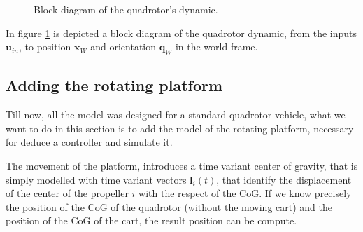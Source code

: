 \begin{figure}[h]
	\caption{Block diagram of the quadrotor's dynamic.}
	\label{fig:quadDynBlock}
\end{figure}

\noindent In figure \ref{fig:quadDynBlock} is depicted a block diagram of the quadrotor dynamic, from the inputs $\mathbf{u}_{in}$, to position $\mathbf{x}_W$ and orientation $\mathbf{q}_W$ in the world frame.

\subsection{Adding the rotating platform}
\label{addPlatform}

Till now, all the model was designed for a standard quadrotor vehicle, what we want to do in this section is to add the model of the rotating platform, necessary for deduce a controller and simulate it.

\noindent The movement of the platform, introduces a time variant center of gravity, that is simply modelled with time variant vectors $\mathbf{l}_i(t)$, that identify the displacement of the center of the propeller $i$ with the respect of the CoG. If we know precisely the position of the CoG of the quadrotor (without the moving cart) and the position of the CoG of the cart, the result position can be compute.


